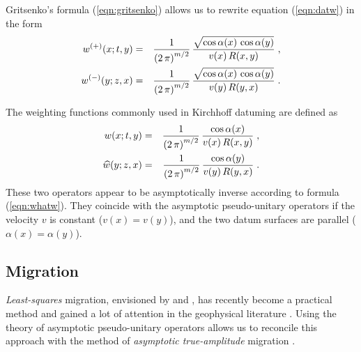 Gritsenko's formula (\ref{eqn:gritsenko}) allows us to
rewrite equation (\ref{eqn:datw}) in the form \cite[]{goldin}
\begin{eqnarray}
w^{(+)}(x;t,y) & = & {1\over{\left(2\,\pi\right)^{m/2}}} \,
{\sqrt{\cos{\alpha(x)}\,\cos{\alpha(y)}}\over {v(x)\,R(x,y)}}\;,
 \\
w^{(-)}(y;z,x) & = & {1\over{\left(2\,\pi\right)^{m/2}}} \,
{\sqrt{\cos{\alpha(x)}\,\cos{\alpha(y)}}\over {v(y)\,R(y,x)}}\;.
\end{eqnarray}
\par
The weighting functions commonly used in Kirchhoff datuming
\cite[]{GEO44.08.13291344,GEO49.08.12391248,svgdat} are defined as
\begin{eqnarray}
w(x;t,y) & = & {1\over{\left(2\,\pi\right)^{m/2}}} \,
{{\cos{\alpha(x)}}\over {v(x)\,R(x,y)}}\;,
 \\
\widehat{w}(y;z,x) & = & {1\over{\left(2\,\pi\right)^{m/2}}} \,
{{\cos{\alpha(y)}}\over {v(y)\,R(y,x)}}\;.
\label{eqn:datw2}
\end{eqnarray}
These two operators appear to be asymptotically inverse according to
formula (\ref{eqn:whatw}). They coincide with the asymptotic pseudo-unitary
operators if the velocity $v$ is constant ($v(x)=v(y)$), and the two
datum surfaces are parallel ($\alpha(x) = \alpha(y)$).


\subsection{Migration}
\emph{Least-squares} migration, envisioned by \cite{lailly} and 
\cite{taran}, has recently
become a practical method and gained a lot of attention in the
geophysical literature \cite[]{nemeth99,chavent,duquet,resol}. Using the
theory of asymptotic pseudo-unitary operators allows us to reconcile 
this approach with the method of \emph{asymptotic true-amplitude}
migration \cite[]{bleistein}.

